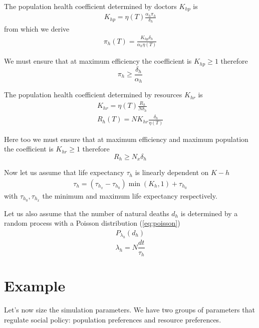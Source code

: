 \documentclass[a4paper,twoside]{article}
\begin{document}
The population health coefficient determined by doctors $ K_{hp} $ is
\begin{align*}
	K_{hp} = \eta(T) \frac{\alpha_h \pi_h}{\delta_h}
\end{align*}
from which we derive
\begin{align*}
	\pi_h(T) = \frac{K_{hp} \delta_h}{\alpha_h \eta(T)}
\end{align*}

We must ensure that at maximum efficiency the coefficient is $ K_{hp} \ge 1 $ therefore
\begin{equation}\label{eq:pih}
	\pi_h \ge \frac{\delta_h}{\alpha_h}
\end{equation}

The population health coefficient determined by resources $ K_{hr} $ is
\begin{align*}
	K_{hr} = \eta(T) \frac{R_h}{N \delta_h}
	\\
	R_h(T) = N K_{hr} \frac{\delta_h}{\eta(T)}
\end{align*}

Here too we must ensure that at maximum efficiency and maximum population the coefficient is $ K_{hr} \ge 1 $ therefore
\begin{equation}\label{eq:Rh}
	R_h \ge N_x \delta_h
\end{equation}

Now let us assume that life expectancy $ \tau_h $ is linearly dependent on $ K-h $
\begin{align*}
	\tau_h = (\tau_{h_x} - \tau_{h_0})  \min(K_h, 1) + \tau_{h_0}
\end{align*}
with $ \tau_{h_0}, \tau_{h_x} $ the minimum and maximum life expectancy respectively.

Let us also assume that the number of natural deaths $ d_h $ is determined by a random process with a Poisson distribution (\ref{eq:poisson})
\begin{align*}
	P_{\lambda_h}(d_h)
\end{align*}
\begin{equation}\label{eq:health}
	\lambda_h = N \frac{dt}{\tau_h}
\end{equation}

\section{Example}

Let's now size the simulation parameters.
We have two groups of parameters that regulate social policy: population preferences and resource preferences.
\end{document}
